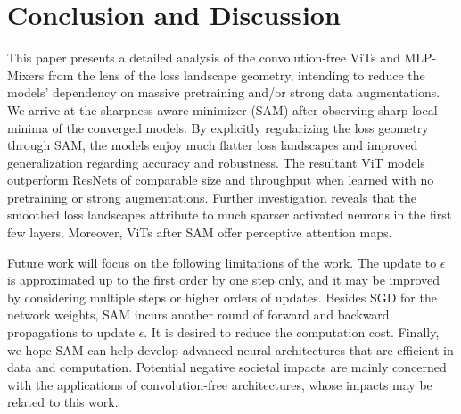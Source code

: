 \documentclass{article}
\begin{document}
\section{Conclusion and Discussion}
\label{sec:conclusion}
This paper presents a detailed analysis of the convolution-free ViTs and MLP-Mixers from the lens of the loss landscape geometry, intending to reduce the models' dependency on massive pretraining and/or strong data augmentations. We arrive at the sharpness-aware minimizer (SAM) after observing sharp local minima of the converged models. 
By explicitly regularizing the loss geometry through SAM, the models enjoy much flatter loss landscapes and improved generalization regarding accuracy and robustness. %
The resultant ViT models outperform ResNets of comparable size and throughput when learned with no pretraining or strong augmentations. Further investigation reveals that the smoothed loss landscapes attribute to much sparser activated neurons in the first few layers. Moreover, ViTs after SAM offer perceptive attention maps.

Future work will focus on the following limitations of the work. The update to $\epsilon$ is approximated up to the first order by one step only, and it may be improved by considering multiple steps or higher orders of updates. Besides SGD for the network weights, SAM incurs another round of
forward and backward propagations to update $\epsilon$. It is desired to reduce the computation cost. Finally, we hope SAM can help develop advanced neural architectures that are efficient in data and computation. Potential negative societal impacts are mainly concerned with the applications of convolution-free architectures, whose impacts may be related to this work.








\clearpage


\end{document}
